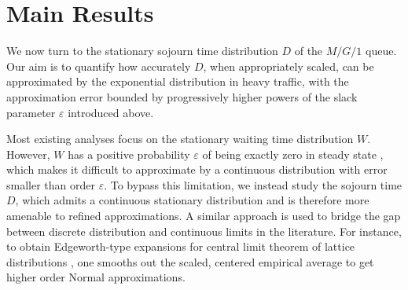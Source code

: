 \documentclass[11pt,letterpaper,reqno]{article}
\theoremstyle{thmstyleone}%
\theoremstyle{thmstyletwo}%
\theoremstyle{thmstylethree}%
\numberwithin{equation}{section}
\begin{document}
\section{Main Results}\label{sec2}


We now turn to the stationary sojourn time distribution $D$ of the $M/G/1$ queue. Our aim is to quantify how accurately $D$, when appropriately scaled, can be approximated by the exponential distribution in heavy traffic, with the approximation error bounded by progressively higher powers of the slack parameter $\varepsilon$ introduced above.

Most existing analyses focus on the stationary waiting time distribution $W$. However, $W$ has a positive probability $\varepsilon$ of being exactly zero in steady state \cite{Pollaczek30}, which makes it difficult to approximate by a continuous distribution with error smaller than order $\varepsilon$. To bypass this limitation, we instead study the sojourn time $D$, which admits a continuous stationary distribution and is therefore more amenable to refined approximations.
A similar approach is used to bridge the gap between discrete distribution and continuous limits in the literature. For instance, to obtain Edgeworth-type expansions for central limit theorem of lattice distributions \cite[Theorem 2 in Chapter XVI, Section 4]{Feller} , one smooths out the scaled, centered empirical average to get higher order Normal approximations.
\end{document}

